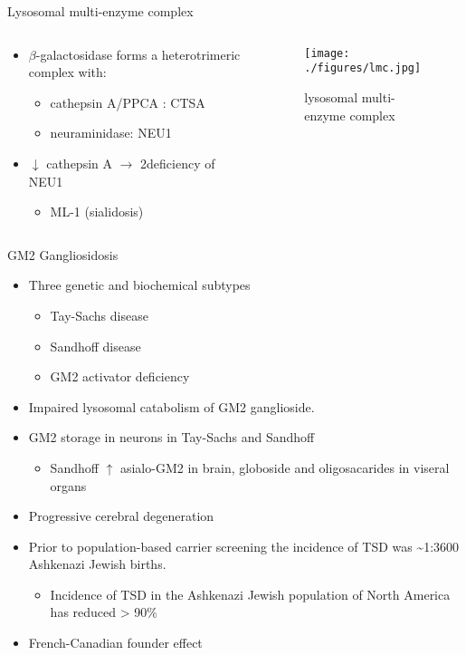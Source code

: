 \documentclass[presentation, smaller]{beamer}
\begin{document}
\begin{frame}[label={sec:orgheadline4}]{Lysosomal multi-enzyme complex}
\begin{columns}
\begin{column}{0.6\columnwidth}
\begin{itemize}
\item \(\beta\)-galactosidase forms a heterotrimeric complex with:
\begin{itemize}
\item cathepsin A/PPCA : CTSA
\item neuraminidase: NEU1
\end{itemize}

\item \(\downarrow\) cathepsin A \(\to\) 2\degree  deficiency of NEU1
\begin{itemize}
\item ML-1 (sialidosis)
\end{itemize}
\end{itemize}
\end{column}

\begin{column}{0.5\columnwidth}
\begin{figure}[htb]
\centering
\texttt{[image: ./figures/lmc.jpg]}
\caption[lmc]{\label{fig:lmc}
lysosomal multi-enzyme complex}
\end{figure}
\end{column}
\end{columns}
\end{frame}


\begin{frame}[label={sec:orgheadline5}]{GM2 Gangliosidosis}
\begin{itemize}
\item Three genetic and biochemical subtypes
\begin{itemize}
\item Tay-Sachs disease
\item Sandhoff disease
\item GM2 activator deficiency
\end{itemize}
\item Impaired lysosomal catabolism of GM2 ganglioside.
\item GM2 storage in neurons in Tay-Sachs and Sandhoff
\begin{itemize}
\item Sandhoff \(\uparrow\) asialo-GM2 in brain, globoside and oligosacarides in viseral organs
\end{itemize}
\item Progressive cerebral degeneration
\item Prior to population-based carrier screening the incidence of TSD was \textasciitilde{}1:3600 Ashkenazi Jewish births.
\begin{itemize}
\item Incidence of TSD in the Ashkenazi Jewish population of North America has reduced > 90\%
\end{itemize}
\item French-Canadian founder effect
\end{itemize}
\end{frame}
\end{document}
